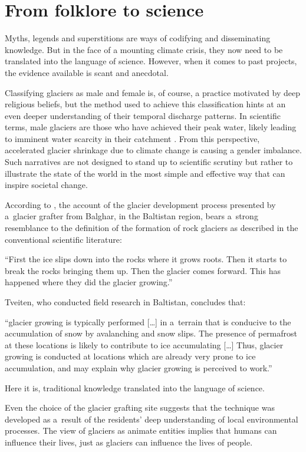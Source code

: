 \section{From folklore to science}

Myths, legends and superstitions are ways of codifying and disseminating knowledge. But in the face of a mounting climate crisis, they now need to be translated into the language of science.
However, when it comes to past projects, the evidence available is scant and anecdotal.

Classifying glaciers as male and female is, of course, a practice motivated by deep religious beliefs, but the method used to
achieve this classification hints at an even deeper understanding of their temporal discharge patterns. In
scientific terms, male glaciers are those who have achieved their peak water, likely leading to imminent
water scarcity in their catchment \citet{}. From this perspective, accelerated glacier shrinkage due to climate
change is causing a gender imbalance. Such narratives are not designed to stand up to scientific scrutiny but rather
to illustrate the state of the world in the most simple and effective way that can inspire societal change.

According to \citet{tveitenGlacierGrowingLocal2007}, the account of the glacier development process presented
by a glacier grafter from Balghar, in the Baltistan region, bears a strong resemblance to the definition of the formation of rock
glaciers as described in the conventional scientific literature: 

\begin{thesis_quotation}
“First the ice slips down into the rocks where it grows
roots. Then it starts to break the rocks bringing them up. Then the glacier comes forward. This has happened
where they did the glacier growing.” 
\end{thesis_quotation}

Tveiten, who conducted field research in Baltistan, concludes that: 

\begin{thesis_quotation}
“glacier growing is typically performed […] in a terrain that is conducive to the accumulation of snow by
avalanching and snow slips. The presence of permafrost at these locations is likely to contribute to ice
accumulating […] Thus, glacier growing is conducted at locations which are already very prone to ice
accumulation, and may explain why glacier growing is perceived to work.” 
\end{thesis_quotation}

Here it is, traditional knowledge translated into the language of science.

Even the choice of the glacier grafting site suggests that the technique was developed as a result of the residents' deep understanding of local environmental processes. The view of glaciers as animate entities implies that
humans can influence their lives, just as glaciers can influence the lives of people.

